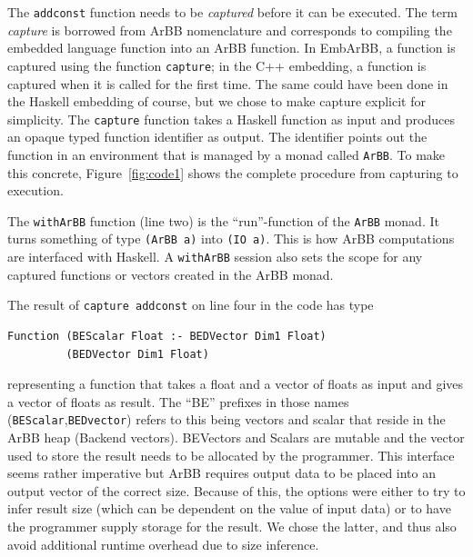 The {\tt addconst} function needs to be {\em captured} before it can be executed. 
The term {\em capture} is borrowed from ArBB nomenclature and corresponds to compiling 
the embedded language function into an ArBB function. In EmbArBB, a function is 
captured using the function {\tt capture}; in the C++ embedding, a function is 
captured when it is called for the first time. The same could have been done in 
the Haskell embedding of course, but we chose to make
capture explicit for simplicity.
The {\tt capture} function takes a Haskell function as input and produces an 
opaque typed function identifier as output. The identifier points out the function 
in an environment that is managed by a monad called {\tt ArBB}. To make this 
concrete, Figure~\ref{fig:code1} shows the complete procedure from capturing 
to execution.  

 
The {\tt withArBB} function (line two) is the ``run''-function of the {\tt ArBB} monad. 
It turns something of type {\tt (ArBB a)} into {\tt (IO a)}. This is how ArBB 
computations are interfaced with Haskell. A {\tt withArBB} session also sets the scope 
for any captured functions or vectors created in the ArBB monad.

The result of {\tt capture addconst} on line four in the code has type 
\begin{verbatim}
Function (BEScalar Float :- BEDVector Dim1 Float) 
         (BEDVector Dim1 Float)
\end{verbatim}
representing a function that takes a float and a vector of floats as 
input and gives a vector of floats as result. The ``BE'' prefixes 
in those names ({\tt BEScalar},{\tt BEDvector}) refers to this being vectors and scalar that 
reside in the ArBB heap (Backend vectors). BEVectors and Scalars are mutable and the 
vector used to store the result needs to be allocated by the programmer. This interface 
seems rather imperative but ArBB requires output data to be
placed into an output vector of the correct size. 
Because of this, the options were either to try to infer result size (which can be dependent on the value of input data) or to have the programmer
supply storage for the result. We chose the latter, and thus also avoid
additional runtime overhead due to size inference.

